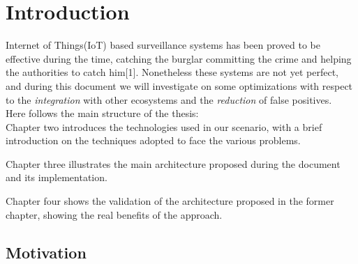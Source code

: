 \chapter{Introduction}

Internet of Things(IoT) based surveillance systems has been proved to be effective during the time,
catching the burglar committing the crime and helping the authorities to
catch him[1]. Nonetheless these systems are not yet perfect, and during
this document we will investigate on some optimizations with respect to
the \textit{integration} with other ecosystems and the \textit{reduction}
of false positives.\\
Here follows the main structure of the thesis:\\

Chapter two introduces the technologies used in our scenario, with a brief
introduction on the techniques adopted to face the various problems.

Chapter three illustrates the main architecture proposed
during the document and its implementation.

Chapter four shows the validation of the architecture proposed in the former
chapter, showing the real benefits of the approach.


\section{Motivation}

